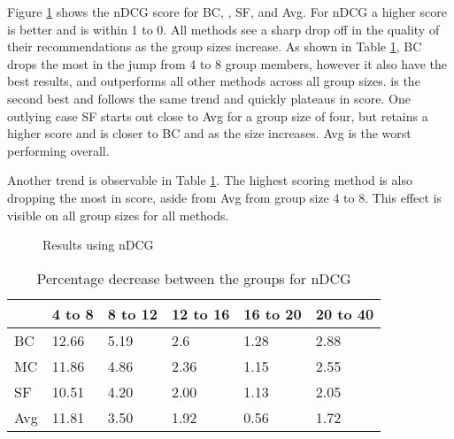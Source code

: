 Figure \ref{fig:ndcg} shows the nDCG score for BC, \MC, SF, and Avg. For nDCG a higher score is better and is within 1 to 0.
All methods see a sharp drop off in the quality of their recommendations as the group sizes increase.
As shown in Table \ref{tbl:ndcg}, BC drops the most in the jump from 4 to 8 group members, however it also have the best results, and outperforms all other methods across all group sizes.
\MC is the second best and follows the same trend and quickly plateaus in score.
One outlying case SF starts out close to Avg for a group size of four, but retains a higher score and is closer to BC and \MC as the size increases.
Avg is the worst performing overall.

Another trend is observable in Table \ref{tbl:ndcg}. The highest scoring method is also dropping the most in score, aside from Avg from group size 4 to 8. This effect is visible on all group sizes for all methods.

\begin{figure}[H]
	\caption{Results using nDCG}\label{fig:ndcg}
\end{figure}


\begin{table}[H]
	\centering
	\begin{tabular}{|l|lllll|}\hline
		& 4 to 8 & 8 to 12 & 12 to 16 & 16 to 20 & 20 to 40 \\\hline
		BC 	& 12.66	& 5.19	& 2.6	& 1.28	& 2.88 \\
		MC  & 11.86	& 4.86	& 2.36	& 1.15	& 2.55 \\
		SF  & 10.51	& 4.20	& 2.00	& 1.13	& 2.05 \\
		Avg	& 11.81	& 3.50 	& 1.92	& 0.56	& 1.72 \\ \hline
	\end{tabular}
	\caption{Percentage decrease between the groups for nDCG}
	\label{tbl:ndcg}
\end{table}

